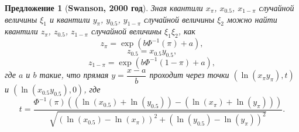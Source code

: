 \documentclass[12pt]{article}
\newtheorem{proposition}[theorem]{Предложение}
\begin{document}
	\begin{proposition}[\textbf{Swanson, 2000 год}]
		Зная квантили $x_{\pi}$, $x_{0.5}$, $x_{1-\pi}$ случайной величины $\xi_{1}$ и квантили $y_{\pi}$, $y_{0.5}$, $y_{1-\pi}$ случайной величины $\xi_{2}$ можно найти квантили $z_{\pi}$, $z_{0.5}$, $z_{1-\pi}$ случайной величины $\xi_{1}\xi_{2}$, как
		\begin{equation*}
			z_{\pi}=\exp(b\Phi^{-1}(\pi)+a),
		\end{equation*}
		\begin{equation*}
			z_{0.5}=x_{0.5}y_{0.5},
		\end{equation*}
		\begin{equation*}
			z_{1-\pi}=\exp(b\Phi^{-1}(1-\pi)+a),
		\end{equation*}
		где $a$ и $b$ такие, что прямая $y=\dfrac{x-a}{b}$ проходит через точки $(\ln(x_{\pi}y_{\pi}), t)$ и $(\ln(x_{0.5}y_{0.5}),0)$, где
		\begin{equation*}
			t = \frac{\Phi^{-1}(\pi)((\ln(x_{0.5})+\ln(y_{0.5}))-(\ln(x_{\pi})+\ln(y_{\pi})))}{\sqrt{(\ln(x_{0.5})-\ln(x_{\pi}))^{2}+(\ln(y_{0.5})-\ln(y_{\pi}))^{2}}}. 
		\end{equation*}
	\end{proposition}
\end{document}
